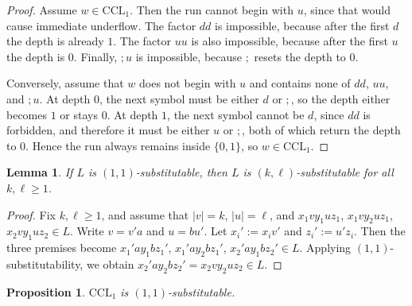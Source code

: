 \documentclass[11pt,a4paper]{article}
\newtheorem{lemma}[theorem]{Lemma}
\newtheorem{proposition}[theorem]{Proposition}
\begin{document}
\begin{proof}
Assume $w\in\mathrm{CCL}_1$. Then the run cannot begin with $u$, since that would cause immediate underflow. The factor $dd$ is impossible, because after the first $d$ the depth is already $1$. The factor $uu$ is also impossible, because after the first $u$ the depth is $0$. Finally, $;u$ is impossible, because $;$ resets the depth to $0$.

Conversely, assume that $w$ does not begin with $u$ and contains none of $dd$, $uu$, and $;u$. At depth $0$, the next symbol must be either $d$ or $;$, so the depth either becomes $1$ or stays $0$. At depth $1$, the next symbol cannot be $d$, since $dd$ is forbidden, and therefore it must be either $u$ or $;$, both of which return the depth to $0$. Hence the run always remains inside $\{0,1\}$, so $w\in\mathrm{CCL}_1$.
\end{proof}

\begin{lemma}\label{lem:11-implies-kl}
If $L$ is $(1,1)$-substitutable, then $L$ is $(k,\ell)$-substitutable for all $k,\ell\ge1$.
\end{lemma}

\begin{proof}
Fix $k,\ell\ge1$, and assume that $|v|=k$, $|u|=\ell$, and $x_1vy_1uz_1$, $x_1vy_2uz_1$, $x_2vy_1uz_2\in L$. Write $v=v'a$ and $u=bu'$. Let $x_i':=x_iv'$ and $z_i':=u'z_i$. Then the three premises become $x_1'ay_1bz_1'$, $x_1'ay_2bz_1'$, $x_2'ay_1bz_2'\in L$. Applying $(1,1)$-substitutability, we obtain $x_2'ay_2bz_2'=x_2vy_2uz_2\in L$.
\end{proof}

\begin{proposition}\label{prop:ccl1-11}
$\mathrm{CCL}_1$ is $(1,1)$-substitutable.
\end{proposition}
\end{document}
